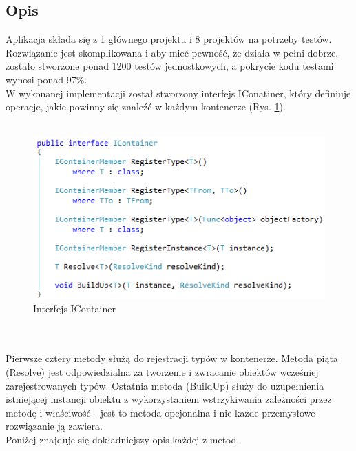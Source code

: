 \documentclass[12pt]{article}
\begin{document}
\subsection{Opis}
Aplikacja składa się z 1 głównego projektu i 8 projektów na potrzeby testów. Rozwiązanie jest skomplikowana i aby mieć pewność, że działa w pełni dobrze, zostało stworzone  ponad 1200 testów jednostkowych, a pokrycie kodu testami wynosi ponad 97\%.\\

W wykonanej implementacji został stworzony interfejs IConatiner, który definiuje operacje, jakie powinny się znaleźć w każdym kontenerze (Rys. \ref{fig:IContainer}).\\ \\
\begin{figure}[h]
	\begin{center}
  		\includegraphics{IContainer.png}
  		\caption{Interfejs IContainer}
  		\label{fig:IContainer}
	\end{center}
\end{figure}\\ \\
Pierwsze cztery metody służą do rejestracji typów w kontenerze. Metoda piąta (Resolve) jest odpowiedzialna za tworzenie i zwracanie obiektów wcześniej zarejestrowanych typów. Ostatnia metoda (BuildUp) służy do uzupełnienia istniejącej instancji obiektu z wykorzystaniem wstrzykiwania zależności przez metodę i właściwość - jest to metoda opcjonalna i nie każde przemysłowe rozwiązanie ją zawiera.\\
Poniżej znajduje się dokładniejszy opis każdej z metod.

\clearpage
\end{document}
